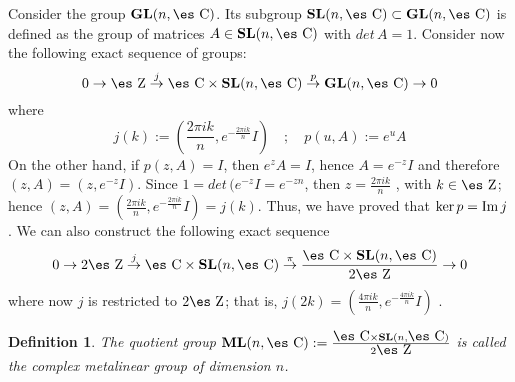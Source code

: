 \documentclass[12pt]{article}
\theoremstyle{plain}
\newtheorem{definition}{Definition}
\def\beq{\begin{equation}}
\def\eeq{\end{equation}}
\def\dst{\(}
\def\map#1{\mathrel{\mathop{\to}\limits^{#1}}}
\def\GL{{\bf GL}(n,\Complex )}
\def\SL{{\bf SL}(n,\Complex )}
\def\ML{{\bf ML}(n,\Complex )}
\def\Zahl{\mbox{\es Z}}
\def\Complex{\mbox{\es C}}
\begin{document}
Consider the group $\GL$. Its subgroup $\SL \subset \GL$
is defined as the group of matrices $A \in \SL$  with $det\, A = 1$.
Consider now the following exact sequence of groups:
\beq
0 \map{} \Zahl \map{j} \Complex \times \SL \map{p} \GL \map{} 0
\label{es1}
\eeq
where
$$
j(k) := \left(\frac{2\pi i k}{n},e^{-\frac{2\pi i k}{n}}I\right)
\quad ; \quad
p(u,A) := e^{u}A
$$
On the other hand, if $p(z,A)=I$, then $e^{z}A=I$, hence $A=e^{-z}I$ and
therefore
$(z,A)=(z,e^{-z}I)$. Since $1=det\, (e^{-z}I=e^{-zn}$, then \dst
z=\frac{2\pi i k}{n}\) ,
with $k \in \Zahl$; hence $(z,A)=(\frac{2\pi i k}{n},e^{-\frac{2\pi i
k}{n}}I)= j(k)$.
Thus, we have proved that $\ker p = {\rm Im}\, j$.
We can also construct the following exact sequence
\beq
0 \map{} 2\Zahl \map{j} \Complex \times \SL \map{\pi}
\frac{\Complex \times \SL}{2\Zahl} \map{} 0
\label{es2}
\eeq
where now $j$ is restricted to $2\Zahl$; that is,
\dst j(2k) =\left(\frac{4\pi i k}{n},e^{-\frac{4\pi i k}{n}}I\right) \)
.

\begin{definition}
The quotient group \dst \ML :=\frac{\Complex \times \SL}{2\Zahl}\)
is called the {\rm complex metalinear group} of dimension $n$.
\end{definition}
\end{document}
